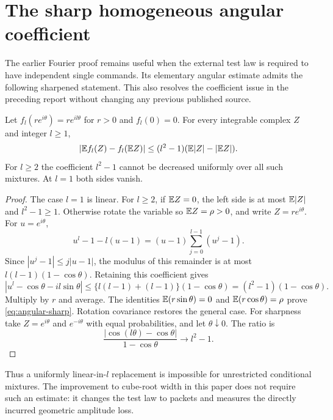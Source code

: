 \section{The sharp homogeneous angular coefficient}\label{sec:angular}
The earlier Fourier proof remains useful when the external test law is
required to have independent single commands. Its elementary angular
estimate admits the following sharpened statement. This also resolves
the coefficient issue in the preceding report without changing any
previous published source.

\begin{lemma}\label{lem:angular}
Let $f_l(re^{i\theta})=r e^{il\theta}$ for $r>0$ and $f_l(0)=0$.
For every integrable complex $Z$ and integer $l\ge1$,
\begin{equation}\label{eq:angular-sharp}
 |\mathbb E f_l(Z)-f_l(\mathbb E Z)|
       \le(l^2-1)(\mathbb E|Z|-|\mathbb E Z|).
\end{equation}
For $l\ge2$ the coefficient $l^2-1$ cannot be decreased uniformly over
all such mixtures. At $l=1$ both sides vanish.
\end{lemma}
\begin{proof}
The case $l=1$ is linear. For $l\ge2$, if $\mathbb E Z=0$, the left side is
at most $\mathbb E|Z|$ and $l^2-1\ge1$. Otherwise rotate the variable so
$\mathbb E Z=\rho>0$, and write $Z=re^{i\theta}$. For $u=e^{i\theta}$,
\[
 u^l-1-l(u-1)=(u-1)\sum_{j=0}^{l-1}(u^j-1).
\]
Since $|u^j-1|\le j|u-1|$, the modulus of this remainder is at most
$l(l-1)(1-\cos\theta)$. Retaining this coefficient gives
\[
 |u^l-\cos\theta-il\sin\theta|
       \le\{l(l-1)+(l-1)\}(1-\cos\theta)
       =(l^2-1)(1-\cos\theta).
\]
Multiply by $r$ and average. The identities
$\mathbb E(r\sin\theta)=0$ and $\mathbb E(r\cos\theta)=\rho$ prove
\eqref{eq:angular-sharp}. Rotation covariance restores the general case.
For sharpness take $Z=e^{i\theta}$ and $e^{-i\theta}$ with equal
probabilities, and let $\theta\downarrow0$. The ratio is
\[
       \frac{|\cos(l\theta)-\cos\theta|}{1-\cos\theta}
                          \longrightarrow l^2-1.
\]
\end{proof}
Thus a uniformly linear-in-$l$ replacement is impossible for unrestricted
conditional mixtures. The improvement to cube-root width in this paper
does not require such an estimate: it changes the test law to packets
and measures the directly incurred geometric amplitude loss.
